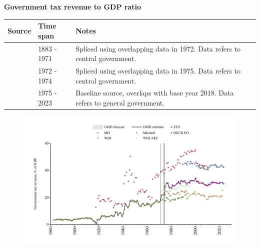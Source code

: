 \documentclass[12pt,a4paper,landscape]{article}
\begin{document}
\begin{adjustbox}{max totalsize={\paperwidth}{\paperheight},center}
\begin{minipage}[t][\textheight][t]{\textwidth}
\vspace*{0.5cm}
{}
\begin{center}
{\Large\bfseries Government tax revenue to GDP ratio}
\end{center}
\vspace{0.5cm}
\begin{table}[H]
\centering
\small
\begin{tabular}{|l|l|l|}
\hline
\textbf{Source} & \textbf{Time span} & \textbf{Notes} \\
\hline
\rowcolor{white}\cite{Mitchell}& 1883 - 1971 &Spliced using overlapping data in 1972. Data refers to central government.\\
\rowcolor{lightgray}\cite{WDI}& 1972 - 1974 &Spliced using overlapping data in 1975. Data refers to central government.\\
\rowcolor{white}\cite{OECD_EO}& 1975 - 2023 &Baseline source, overlaps with base year 2018. Data refers to general government.\\
\hline
\end{tabular}
\end{table}
\begin{figure}[H]
\centering
\includegraphics[width=\textwidth,height=0.6\textheight,keepaspectratio]{graphs/FIN_govtax_GDP.pdf}
\end{figure}
\end{minipage}
\end{adjustbox}
\end{document}
